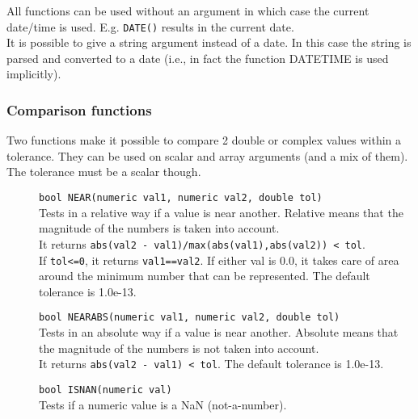 All functions can be used without an argument in which case the current
date/time is used. E.g. \texttt{DATE()} results in the current date.
\\It is possible to give a string argument instead of a date. In this
case the string is parsed and converted to a date (i.e., in fact the
function DATETIME is used implicitly).

\subsubsection{Comparison functions}
Two functions make it possible to compare 2 double or complex
values within a tolerance.
They can be used on scalar and array arguments (and a mix of them).
The tolerance must be a scalar though.
\begin{description}
  \item[] \texttt{bool NEAR(numeric val1, numeric val2, double tol)}\\
    Tests in a relative way if a value is near another. Relative
    means that the
    magnitude of the numbers is taken into account.
    \\It returns
    \texttt{abs(val2 - val1)/max(abs(val1),abs(val2)) < tol}.
    \\If \texttt{tol<=0}, it returns \texttt{val1==val2}.
    If either val is 0.0, it takes
    care of area around the minimum number that can be represented.
    The default tolerance is 1.0e-13.
  \item[] \texttt{bool NEARABS(numeric val1, numeric val2, double tol)}\\
    Tests in an absolute way if a value is near another. Absolute
    means that the
    magnitude of the numbers is not taken into account.
    \\It returns \texttt{abs(val2 - val1) < tol}.
    The default tolerance is 1.0e-13.
  \item[] \texttt{bool ISNAN(numeric val)}\\
    Tests if a numeric value is a NaN (not-a-number).
\end{description}

